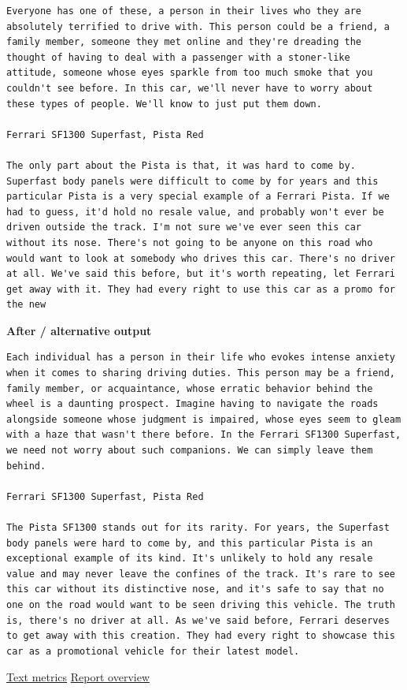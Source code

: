 \begin{Verbatim}
Everyone has one of these, a person in their lives who they are absolutely terrified to drive with. This person could be a friend, a family member, someone they met online and they're dreading the thought of having to deal with a passenger with a stoner-like attitude, someone whose eyes sparkle from too much smoke that you couldn't see before. In this car, we'll never have to worry about these types of people. We'll know to just put them down.

Ferrari SF1300 Superfast, Pista Red

The only part about the Pista is that, it was hard to come by. Superfast body panels were difficult to come by for years and this particular Pista is a very special example of a Ferrari Pista. If we had to guess, it'd hold no resale value, and probably won't ever be driven outside the track. I'm not sure we've ever seen this car without its nose. There's not going to be anyone on this road who would want to look at somebody who drives this car. There's no driver at all. We've said this before, but it's worth repeating, let Ferrari get away with it. They had every right to use this car as a promo for the new
\end{Verbatim}

\textbf{After / alternative output}

\begin{Verbatim}
Each individual has a person in their life who evokes intense anxiety when it comes to sharing driving duties. This person may be a friend, family member, or acquaintance, whose erratic behavior behind the wheel is a daunting prospect. Imagine having to navigate the roads alongside someone whose judgment is impaired, whose eyes seem to gleam with a haze that wasn't there before. In the Ferrari SF1300 Superfast, we need not worry about such companions. We can simply leave them behind.

Ferrari SF1300 Superfast, Pista Red

The Pista SF1300 stands out for its rarity. For years, the Superfast body panels were hard to come by, and this particular Pista is an exceptional example of its kind. It's unlikely to hold any resale value and may never leave the confines of the track. It's rare to see this car without its distinctive nose, and it's safe to say that no one on the road would want to be seen driving this vehicle. The truth is, there's no driver at all. As we've said before, Ferrari deserves to get away with this creation. They had every right to showcase this car as a promotional vehicle for their latest model.
\end{Verbatim}

\href{records/docs/watermarking/text.tex}{Text metrics} \textbar{}
\href{../docs/watermarking/README.md}{Report overview}
